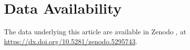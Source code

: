 \documentclass[fleqn,usenatbib]{mnras}
\begin{document}
\section*{Data Availability}
The data underlying this article are available in Zenodo \citep{cfht_dataset_zenodo}, at \url{https://dx.doi.org/10.5281/zenodo.5295743}.

%

%







\appendix

%


%
%


\bsp	%
\label{lastpage}
\end{document}
